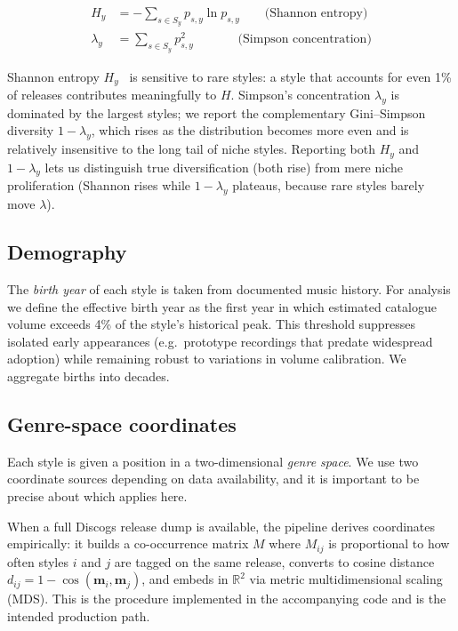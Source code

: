 \documentclass[12pt, a4paper]{article}
\begin{document}
\begin{align}
H_y &= -\sum_{s \in S_y} p_{s,y} \ln p_{s,y}
    \qquad \text{(Shannon entropy)} \label{eq:shannon} \\[4pt]
\lambda_y &= \sum_{s \in S_y} p_{s,y}^{2}
    \qquad\quad\;\; \text{(Simpson concentration)} \label{eq:simpson}
\end{align}

Shannon entropy $H_y$~\citep{shannon1948mathematical} is sensitive to rare
styles: a style that accounts for even 1\% of releases contributes
meaningfully to $H$. Simpson's concentration $\lambda_y$ is dominated by the
largest styles; we report the complementary Gini--Simpson diversity
$1 - \lambda_y$, which rises as the distribution becomes more even and is
relatively insensitive to the long tail of niche styles. Reporting both
$H_y$ and $1 - \lambda_y$ lets us distinguish true diversification (both
rise) from mere niche proliferation (Shannon rises while $1 - \lambda_y$
plateaus, because rare styles barely move $\lambda$).

\subsection{Demography}

The \emph{birth year} of each style is taken from documented music history.
For analysis we define the effective birth year as the first year in which
estimated catalogue volume exceeds 4\% of the style's historical peak.
This threshold suppresses isolated early appearances (e.g.\ prototype
recordings that predate widespread adoption) while remaining robust to
variations in volume calibration. We aggregate births into decades.

\subsection{Genre-space coordinates}
\label{subsec:coords}

Each style is given a position in a two-dimensional \emph{genre space}.
We use two coordinate sources depending on data availability, and it is
important to be precise about which applies here.

When a full Discogs release dump is available, the pipeline derives
coordinates empirically: it builds a co-occurrence matrix $M$ where $M_{ij}$
is proportional to how often styles $i$ and $j$ are tagged on the same
release, converts to cosine distance
$d_{ij} = 1 - \cos(\mathbf{m}_i, \mathbf{m}_j)$, and embeds in
$\mathbb{R}^{2}$ via metric multidimensional scaling (MDS). This is the
procedure implemented in the accompanying code and is the intended
production path.
\end{document}
